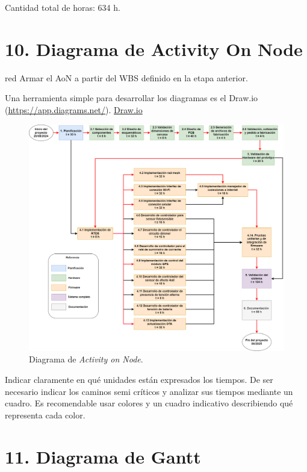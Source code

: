 \documentclass[
11pt, %
]{charter}
\begin{document}
Cantidad total de horas: 634 h.

\section{10. Diagrama de Activity On Node}
\label{sec:AoN}

\begin{consigna}{red}
Armar el AoN a partir del WBS definido en la etapa anterior.

Una herramienta simple para desarrollar los diagramas es el Draw.io (\url{https://app.diagrams.net/}).
\href{https://app.diagrams.net}{Draw.io}


\begin{figure}[htpb]
\centering 
\includegraphics[width=.8\textwidth]{./Figuras/AoN.png}
\caption{Diagrama de \textit{Activity on Node}.}
\label{fig:AoN}
\end{figure}

Indicar claramente en qué unidades están expresados los tiempos.
De ser necesario indicar los caminos semi críticos y analizar sus tiempos mediante un cuadro.
Es recomendable usar colores y un cuadro indicativo describiendo qué representa cada color.

\end{consigna}

\section{11. Diagrama de Gantt}
\label{sec:gantt}
\end{document}

